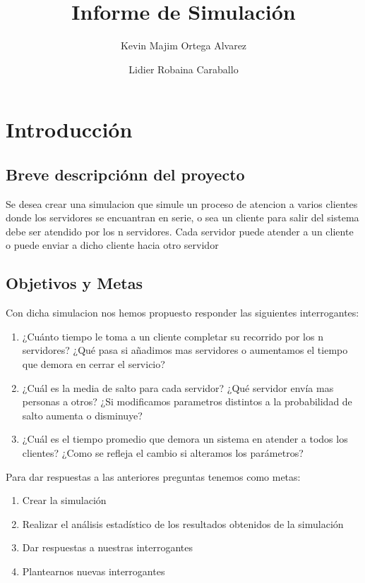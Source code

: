 \documentclass{article}
\begin{document}
\title{Informe de Simulación}
\author {Kevin Majim Ortega Alvarez \and Lidier Robaina Caraballo}
\maketitle

\section{Introducción}
\subsection{Breve descripciónn del proyecto}

Se desea crear una simulacion que simule un proceso de atencion  a varios clientes donde los servidores se encuantran en serie, o sea un cliente para
salir del sistema debe ser atendido por los n servidores. Cada servidor puede atender a un cliente o puede enviar a dicho cliente hacia otro servidor

\subsection{Objetivos y Metas}
Con dicha simulacion nos hemos propuesto responder las siguientes interrogantes:
\begin{enumerate}
\item{¿Cuánto tiempo le toma a un cliente completar su recorrido por los n servidores? ¿Qué pasa si añadimos mas servidores o aumentamos el tiempo que demora en cerrar el servicio?}
\item{¿Cuál es la media de salto para cada servidor? ¿Qué servidor envía mas personas a otros? ¿Si modificamos parametros distintos a la probabilidad de salto aumenta o disminuye?}
\item{¿Cuál es el tiempo promedio que demora un sistema en atender a todos los clientes? ¿Como se refleja el cambio si alteramos los parámetros?}\\
\end{enumerate}
Para dar respuestas a las anteriores preguntas tenemos como metas:
\begin{enumerate}
\item{Crear la simulación}
\item{Realizar el análisis estadístico de los resultados obtenidos de la simulación}
\item{Dar respuestas a nuestras interrogantes}
\item{Plantearnos nuevas interrogantes}
\end{enumerate}
\end{document}
